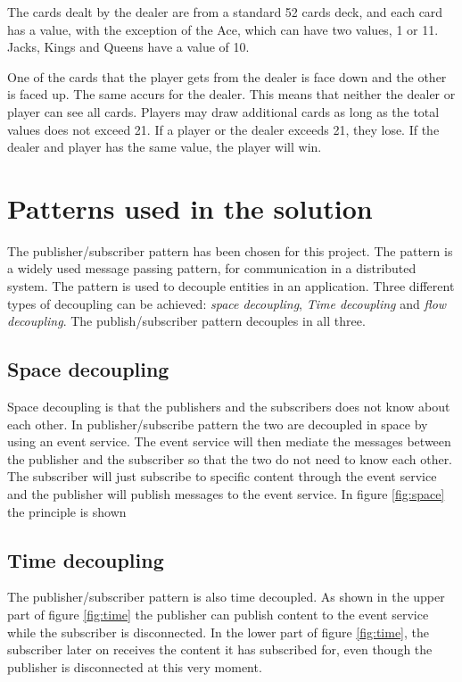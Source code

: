 The cards dealt by the dealer are from a standard 52 cards deck, and each card has a value, with the exception of the Ace, which can have two values, 1 or 11. Jacks, Kings and Queens have a value of 10.  

One of the cards that the player gets from the dealer is face down and the other is faced up. The same accurs for the dealer. This means that neither the dealer or player can see all cards. Players may draw additional cards as long as the total values does not exceed 21. If a player or the dealer exceeds 21, they lose. If the dealer and player has the same value, the player will win.

\section{Patterns used in the solution}
\label{chp:patterns}
The publisher/subscriber pattern has been chosen for this project. The pattern is a widely used message passing pattern, for communication in a distributed system. The pattern is used to decouple entities in an application. Three different types of decoupling can be achieved: \emph{space decoupling}, \emph{Time decoupling} and \emph{flow decoupling}. The publish/subscriber pattern decouples in all three.

\subsection{Space decoupling}
Space decoupling is that the publishers and the subscribers does not know about each other. In publisher/subscribe pattern the two are decoupled in space by using an event service. The event service will then mediate the messages between the publisher and the subscriber so that the two do not need to know each other. The subscriber will just subscribe to specific content through the event service and the publisher will publish messages to the event service. In figure \ref{fig:space} the principle is shown


\subsection{Time decoupling}
The publisher/subscriber pattern is also time decoupled. As shown in the upper part of figure \ref{fig:time} the publisher can publish content to the event service while the subscriber is disconnected. In the lower part of figure \ref{fig:time}, the subscriber later on receives the content it has subscribed for, even though the publisher is disconnected at this very moment.

